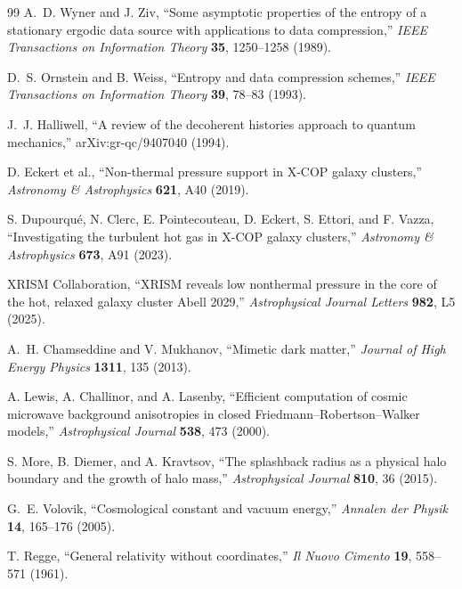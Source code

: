 \documentclass[11pt]{article}
\begin{document}
\begin{thebibliography}{99}
A.~D. Wyner and J. Ziv,
``Some asymptotic properties of the entropy of a stationary ergodic data source with applications to data compression,''
\emph{IEEE Transactions on Information Theory} \textbf{35}, 1250--1258 (1989).

D.~S. Ornstein and B. Weiss,
``Entropy and data compression schemes,''
\emph{IEEE Transactions on Information Theory} \textbf{39}, 78--83 (1993).

J.~J. Halliwell,
``A review of the decoherent histories approach to quantum mechanics,''
arXiv:gr-qc/9407040 (1994).

D. Eckert et al.,
``Non-thermal pressure support in X-COP galaxy clusters,''
\emph{Astronomy \& Astrophysics} \textbf{621}, A40 (2019).

S. Dupourqu\'e, N. Clerc, E. Pointecouteau, D. Eckert, S. Ettori, and F. Vazza,
``Investigating the turbulent hot gas in X-COP galaxy clusters,''
\emph{Astronomy \& Astrophysics} \textbf{673}, A91 (2023).

XRISM Collaboration,
``XRISM reveals low nonthermal pressure in the core of the hot, relaxed galaxy cluster Abell 2029,''
\emph{Astrophysical Journal Letters} \textbf{982}, L5 (2025).

A.~H. Chamseddine and V. Mukhanov,
``Mimetic dark matter,''
\emph{Journal of High Energy Physics} \textbf{1311}, 135 (2013).

A. Lewis, A. Challinor, and A. Lasenby,
``Efficient computation of cosmic microwave background anisotropies in closed Friedmann--Robertson--Walker models,''
\emph{Astrophysical Journal} \textbf{538}, 473 (2000).

S. More, B. Diemer, and A. Kravtsov,
``The splashback radius as a physical halo boundary and the growth of halo mass,''
\emph{Astrophysical Journal} \textbf{810}, 36 (2015).

G.~E. Volovik,
``Cosmological constant and vacuum energy,''
\emph{Annalen der Physik} \textbf{14}, 165--176 (2005).

T. Regge,
``General relativity without coordinates,''
\emph{Il Nuovo Cimento} \textbf{19}, 558--571 (1961).


\end{thebibliography}
\end{document}
